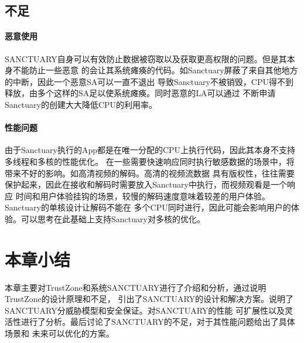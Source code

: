 \subsection{不足}
\paragraph{恶意使用}
SANCTUARY自身可以有效防止数据被窃取以及获取更高权限的问题。但是其本身不能防止一些恶意
的会让其系统瘫痪的代码。如Sanctuary屏蔽了来自其他地方的中断，因此一个恶意SA可以一直不退出
导致Sanctuary不被销毁，CPU得不到释放，由多个这样的SA足以使系统瘫痪。同时恶意的LA可以通过
不断申请Sanctuary的创建大大降低CPU的利用率。

\paragraph{性能问题}
由于Sanctuary执行的App都是在唯一分配的CPU上执行代码，因此其本身不支持多线程和多核的性能优化。
在一些需要快速响应同时执行敏感数据的场景中，将带来不好的影响。如高清视频的解码。高清的视频流数据
具有版权性，往往需要保护起来，因此在接收和解码时需要放入Sanctuary中执行，而视频观看是一个响应
时间和用户体验挂钩的场景，较慢的解码速度意味着较差的用户体验。Sanctuary的单核设计让解码不能在
多个CPU同时进行，因此可能会影响用户的体验。可以思考在此基础上支持Sanctuary对多核的优化。


\section{本章小结}

本章主要对TrustZone和系统SANCTUARY进行了介绍和分析，通过说明TrustZone的设计原理和不足，
引出了SANCTUARY的设计和解决方案。说明了SANCTUARY分威胁模型和安全保证。对SANCTUARY的性能
可扩展性以及灵活性进行了分析。最后讨论了SANCTUARY的不足，对于其性能问题给出了具体场景和
未来可以优化的方案。
